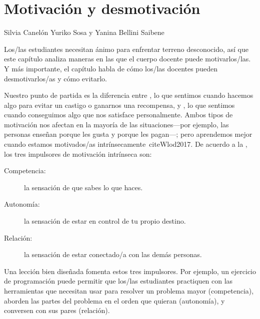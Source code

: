 \chapter{Motivación y desmotivación}\label{s:motivation}

\begin{reviewer}
{Silvia Canelón}
{Yuriko Sosa y Yanina Bellini Saibene}
\end{reviewer}

Los/las estudiantes necesitan ánimo para enfrentar terreno desconocido,
así que este capítulo analiza maneras en las que el cuerpo docente puede motivarlos/las.
Y más importante,
el capítulo habla de cómo los/las docentes pueden desmotivarlos/as
y cómo evitarlo.

Nuestro punto de partida es la diferencia entre
,
lo que sentimos cuando hacemos algo para evitar un castigo o ganarnos una recompensa,
y ,
lo que sentimos cuando conseguimos algo que nos satisface personalmente.
Ambos tipos de motivación nos afectan en la mayoría de las situaciones---por ejemplo,
las personas enseñan porque les gusta y porque les pagan---; pero
aprendemos mejor cuando estamos motivados/as intrínsecamente~cite{Wlod2017}.
De acuerdo a la 
,
los tres impulsores de motivación intrínseca son:

\begin{description}

\item[Competencia:]
  la sensación de que sabes lo que haces. 

\item[Autonomía:]
  la sensación de estar en control de tu propio destino.

\item[Relación:]
  la sensación de estar conectado/a con las demás personas.

\end{description}

Una lección bien diseñada fomenta estos tres impulsores.
Por ejemplo,
un ejercicio de programación puede permitir que los/las estudiantes
practiquen con las herramientas que necesitan usar para resolver un problema mayor (competencia),
aborden las partes del problema en el orden que quieran (autonomía),
y conversen con sus pares (relación).

